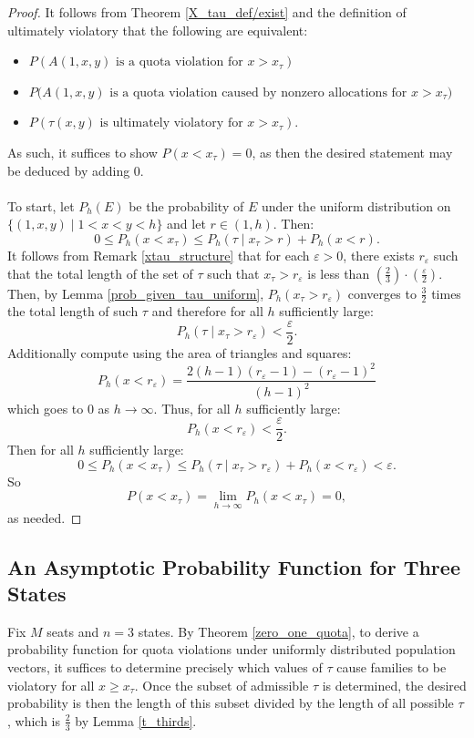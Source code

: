 \documentclass[11pt]{article}
\theoremstyle{definition}
\theoremstyle{definition}
\begin{document}
\begin{proof}
It follows from  Theorem \ref{X_tau_def/exist} and the definition of ultimately violatory that the following are equivalent:
\begin{itemize} 
\item $P(A(1,x,y) \text{ is a quota violation for $x>x_\tau$}) $
\item $P(A(1,x,y) \text{ is a quota violation caused by nonzero allocations for $x>x_\tau$)}$ 
\item $P(\tau(x,y) \text{ is ultimately violatory for $x>x_\tau$}).$
\end{itemize}
As such, it suffices to show $P(x<x_\tau) = 0$, as then the desired statement may be deduced by adding $0$. \\
\\
To start, let $P_h(E)$ be the probability of $E$ under the uniform distribution on $\{(1,x,y) \mid 1<x<y<h \}$ and let $r \in (1, h)$. Then:
\[ 0 \leq P_h(x<x_\tau) \leq P_h(\tau \mid x_\tau > r) + P_h( x< r ). \]
It follows from Remark \ref{xtau_structure} that for each $\varepsilon > 0$, there exists $r_\varepsilon$ such that the total length of the set of $\tau$ such that $x_\tau > r_\varepsilon$ is less than $\left(\frac{2}{3} \right) \cdot\left( \frac{\varepsilon}{2} \right)$. Then, by Lemma \ref{prob_given_tau_uniform}, $P_h(x_\tau > r_\varepsilon)$ converges to $\frac{3}{2}$ times the total length of such $\tau$ and therefore for all $h$ sufficiently large:
\[ P_h(\tau \mid x_\tau > r_\varepsilon ) < \frac{\varepsilon}{2}. \]
Additionally compute using the area of triangles and squares:
\[ P_h(x<r_\varepsilon) = \frac{2(h-1)(r_\varepsilon -1) - (r_\varepsilon -1)^2}{(h-1)^2} \]
which goes to $0$ as $h \to \infty$. Thus, for all $h$ sufficiently large:
\[ P_h( x< r_\varepsilon ) < \frac{\varepsilon}{2}. \]
Then for all $h$ sufficiently large:
\[ 0 \leq P_h(x<x_\tau) \leq P_h(\tau \mid x_\tau > r_\varepsilon) + P_h( x< r_\varepsilon ) < \varepsilon. \]
So
\[ P(x<x_\tau) = \lim_{h \to \infty} P_h(x<x_\tau) = 0, \]
as needed.


\end{proof}



\subsection{An Asymptotic Probability Function for Three States}
Fix $M$ seats and $n=3$ states. By Theorem \ref{zero_one_quota}, to derive a probability function for quota violations under uniformly distributed population vectors, it suffices to determine precisely which values of $\tau$ cause families to be violatory for all $x \geq x_\tau$. Once the subset of admissible $\tau$ is determined, the desired probability is then the length of this subset divided by the length of all possible $\tau$, which is $\frac{2}{3}$ by Lemma \ref{t_thirds}. 
\end{document}
